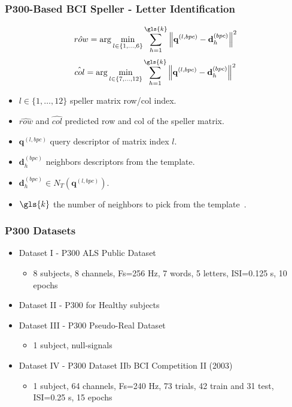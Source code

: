 \documentclass[aspectratio=169]{beamer}
\newcommand\Fontre{\fontsize{16}{16.2}\selectfont}
\begin{document}
\begin{frame}
\frametitle{P300-Based BCI Speller - Letter Identification}
\begin{center}
\vspace{-\baselineskip}
\begin{equation}
\hat{row} = \arg \min_{l \in \{1,\dots,6\}} \sum_{h=1}^{\gls{k}}  {\left\lVert \mathbf{q}^{(l,bpc)} -  \mathbf{d}_{h}^{(bpc)} \right\rVert}  ^{2}
\label{eq:multiclassificationrow}
\end{equation}
\begin{equation}
\hat{col} = \arg \min_{l \in \{7,\dots,12\}} \sum_{h=1}^{\gls{k}}  {\left\lVert \mathbf{q}^{(l,bpc)} -  \mathbf{d}_{h}^{(bpc)} \right\rVert}  ^{2}
\label{eq:multiclassificationcol}
\end{equation}

\begin{itemize}
\item $l \in \{1,\dots,12\}$ speller matrix row/col index.
\item $\hat{row}$  and $\hat{col}$ predicted row and col of the speller matrix.
\item $\mathbf{q}^{(l,bpc)} $ query descriptor of matrix index $l$.
\item $\mathbf{d}_{h}^{(bpc)} $ neighbors descriptors from the template.
\item $\mathbf{d}_{h}^{(bpc)} \in N_T(  \mathbf{q}^{(l,bpc)} )$.
\item $\gls{k}$ the number of neighbors to pick from the template~.
\end{itemize}

\end{center}
\end{frame}   


\begin{frame}
\frametitle{P300 Datasets}
\begin{center}
\begin{itemize}
 \item<1-> \Fontre Dataset I - P300 ALS Public Dataset 
 \begin{itemize}
 \item 8 subjects, 8 channels, Fs=256 Hz, 7 words, 5 letters, ISI=0.125 s, 10 epochs
 \end{itemize}
 \item<2-> \Fontre Dataset II - P300 for Healthy subjects
 \item<3-> \Fontre Dataset III - P300 Pseudo-Real Dataset 
 \begin{itemize}
 \item 1 subject, null-signals
 \end{itemize}
 \item<4-> \Fontre Dataset IV - P300 Dataset IIb BCI Competition II (2003) 
 \begin{itemize}
 \item 1 subject, 64 channels, Fs=240 Hz, 73 trials, 42 train and 31 test, ISI=0.25 s, 15 epochs
 \end{itemize}
\end{itemize}
\end{center}
\end{frame} 
\end{document}
